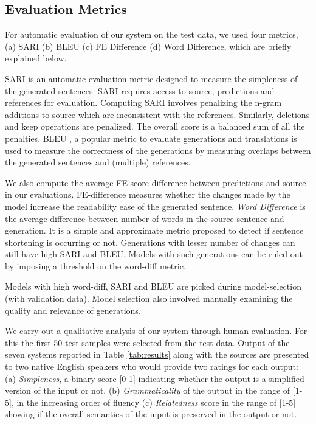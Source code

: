 \documentclass[11pt,a4paper]{article}
\begin{document}
\subsection{Evaluation Metrics}
For automatic evaluation of our system on the test data, we used four metrics, (a) SARI (b)  BLEU (c) FE Difference (d) Word Difference, which are briefly explained below.

SARI \cite{xu2016optimizing} is an automatic evaluation metric designed to measure the simpleness of the generated sentences. SARI requires access to source, predictions and references for evaluation. Computing SARI involves penalizing the n-gram additions to source which are inconsistent with the references. Similarly, deletions and keep operations are penalized. The overall score is a balanced sum of all the penalties. BLEU \cite{papineni2002bleu}, a popular metric to evaluate generations and translations is used to measure the correctness of the generations by measuring overlaps between the generated sentences and (multiple) references.

We also compute the average FE score difference between predictions and source in our evaluations. FE-difference measures whether the changes made by the model increase the readability ease of the generated sentence. \textit{Word Difference} is the average difference between number of words in the source sentence and generation. It is a simple and approximate metric proposed to detect if sentence shortening is occurring or not. Generations with lesser number of changes can still have high SARI and BLEU. Models with such generations can be ruled out by imposing a threshold on the word-diff metric.

Models with high word-diff, SARI and BLEU are picked during model-selection (with validation data). Model selection also involved manually examining the quality and relevance of generations.

We carry out a qualitative analysis of our system through human evaluation. For this the first 50 test samples were selected from the test data. Output of the seven systems reported in Table \ref{tab:results} along with the sources are presented to two native English speakers who would provide two ratings for each output: (a) \textit{Simpleness}, a binary score [0-1] indicating whether the output is a simplified version of the input or not, (b) \textit{Grammaticality} of the output in the range of [1-5], in the increasing order of fluency (c) \textit{Relatedness} score in the range of [1-5] showing if the overall semantics of the input is preserved in the output or not.
\end{document}
